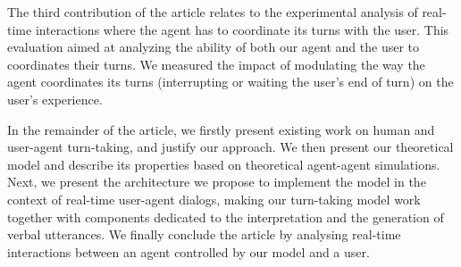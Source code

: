 The third contribution of the article relates to the experimental analysis of real-time interactions where the agent has to coordinate its turns with the user. This evaluation aimed at analyzing the ability of both our agent and the user to coordinates their turns. 
We measured the impact of modulating the way the agent coordinates its turns (interrupting or waiting the user's end of turn) on the user's experience. 

In the remainder of the article, we firstly present existing work on human and user-agent turn-taking, and justify our approach. We then present our theoretical model and describe its properties based on theoretical agent-agent simulations.  Next, we present the architecture we propose to implement the model in the context of real-time user-agent dialogs, making our turn-taking model work together with components dedicated to the interpretation and the generation of verbal utterances. We finally conclude the article by analysing real-time interactions between an agent controlled by our model and a user. 
